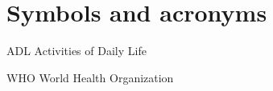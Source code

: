 \documentclass[../../main.tex]{subfiles}
\begin{document}
\chapter*{Symbols and acronyms}
\begin{abbrv}
    \item[ADL]                   Activities of Daily Life
    \item[WHO]                   World Health Organization
\end{abbrv}
\end{document}

